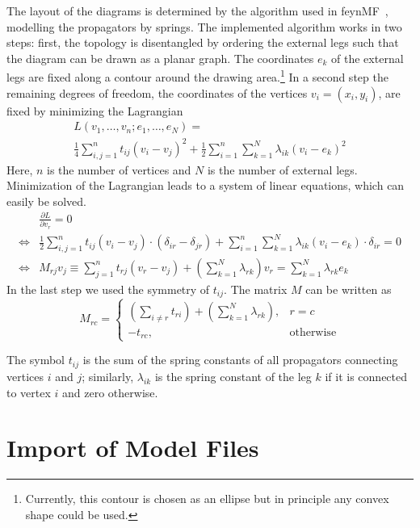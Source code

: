 \documentclass[11pt,a4paper]{refrep}
\begin{document}
The layout of the diagrams is determined by the algorithm used in
\textsf{feynMF}~\cite{Ohl:1995kr}, modelling the propagators by springs.
The implemented algorithm works in two steps: first, the topology is
disentangled by ordering the external legs such that the diagram can
be drawn as a planar graph. The coordinates $e_k$
of the external legs are
fixed along a contour around the drawing area.\footnote{Currently,
this contour is chosen as an ellipse but in principle any convex
shape could be used.}
In a second step the remaining degrees of freedom, the coordinates
of the vertices $v_i=(x_i, y_i)$, are fixed by minimizing the Lagrangian
\begin{multline}
L(v_1, \ldots, v_n; e_1, \ldots, e_N) =\\
 \frac14\sum_{i,j=1}^n t_{ij}\left(v_i-v_j\right)^2
+\frac12\sum_{i=1}^n\sum_{k=1}^N\lambda_{ik}\left(v_i-e_k\right)^2
\end{multline}
Here, $n$ is the number of vertices and $N$ is the number of external
legs.
Minimization of the Lagrangian leads to a system of linear equations, which
can easily be solved.
\begin{align*}
&\frac{\partial L}{\partial v_r}=0\\
\Leftrightarrow&
 \frac12\sum_{i,j=1}^n t_{ij}\left(v_i-v_j\right)
     \cdot\left(\delta_{ir}-\delta_{jr}\right)
+\sum_{i=1}^n\sum_{k=1}^N\lambda_{ik}\left(v_i-e_k\right)
     \cdot\delta_{ir}=0\\
\Leftrightarrow&
M_{rj}v_j\equiv
 \sum_{j=1}^n t_{rj}\left(v_r-v_j\right)
+\left(\sum_{k=1}^N\lambda_{rk}\right)v_r
=\sum_{k=1}^N\lambda_{rk}e_k
\end{align*}
In the last step we used the symmetry of $t_{ij}$.
The matrix $M$ can be written as
\begin{equation}
M_{rc}=\left\{\begin{array}{ll}
\left(\sum_{i\neq r}t_{ri}\right)+
\left(\sum_{k=1}^N\lambda_{rk}\right),&
r=c\\
-t_{rc},&\text{otherwise}
\end{array}\right.
\end{equation}

The symbol $t_{ij}$ is the sum of the spring constants of all
propagators connecting vertices $i$ and $j$; similarly, $\lambda_{ik}$
is the spring constant of the leg $k$ if it is connected to vertex $i$
and zero otherwise.

\section{Import of Model Files}
\end{document}

